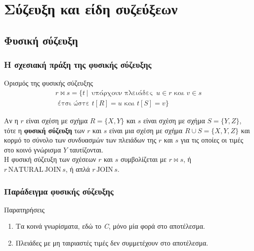 
\section[{\en join}]{\textgreek{Σύζευξη και είδη συζεύξεων}}

\subsection[{\en natjoin}]{\textgreek{Φυσική σύζευξη}}

\begin{frame}
\frametitle{Η σχεσιακή πράξη της φυσικής σύζευξης}
\begin{minipage}{\wE}
  \begin{block}{Ορισμός της φυσικής σύζευξης} 
    \[
       \begin{split}
       r \bowtie s = \{ t \,|\, \text{ υπάρχουν πλειάδες } \, u \in r \text{ και } v \in s   \\
                \text{ έτσι ώστε } t[R]=u \text{ και } t[S]=v\}         
       \end{split}
    \]
    \par Αν η $r$ είναι σχέση με σχήμα $R=\{X,Y\}$ και $s$ είναι σχέση με σχήμα $S=\{Y,Z\}$,
    τότε η {\bf φυσική σύζευξη} των $r$ και $s$
    είναι μια σχέση με σχήμα $R \cup S = \{X,Y,Z\}$ και κορμό το σύνολο των συνδυασμών των
    πλειάδων της $r$ και $s$ για τις οποίες οι τιμές στο κοινό γνώρισμα $Y$ ταυτίζονται.   \\
    Η φυσική σύζευξη των σχέσεων $r$ και $s$ συμβολίζεται με $r \bowtie s$,
    ή $r \, \mathrm{NATURAL\, JOIN} \, s$, ή απλά $r \, \mathrm{JOIN} \, s$.
  \end{block}
\end{minipage}
\end{frame}



\begin{frame}
\frametitle{Παράδειγμα φυσικής σύζευξης}
  \scalebox{1.5}{  } 
  \begin{minipage}{\wE} 
    \begin{block}{Παρατηρήσεις}
      \begin{enumerate}
        \item Τα κοινά γνωρίσματα, εδώ το {\en\em C}, μόνο μία φορά στο αποτέλεσμα.
        \item Πλειάδες με μη ταιριαστές τιμές δεν συμμετέχουν στο αποτέλεσμα.
      \end{enumerate}
  \end{block}
\end{minipage}
\end{frame}

